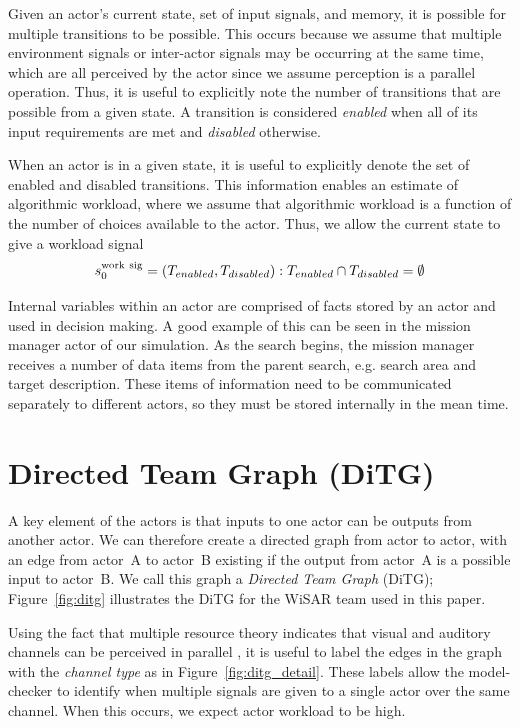 Given an actor's current state, set of input signals, and memory, it is possible for multiple transitions to be possible.  This occurs because we assume that multiple environment signals or inter-actor signals may be occurring at the same time, which are all perceived by the actor since we assume perception is a parallel operation.  Thus, it is useful to explicitly note the number of transitions that are possible from a given state.   A transition is considered {\em enabled} when all of its input
requirements are met and {\em disabled} otherwise. 

When an actor is in a given state, it is useful to explicitly denote the set of enabled and disabled transitions.  This information enables an estimate of algorithmic workload, where we assume that algorithmic workload is a function of the number of choices available to the actor.  Thus, we allow the current state to give a workload signal
\begin{equation}
	s_0^{\rm work\  sig} = (T_{enabled}, T_{disabled}) : T_{enabled} \cap T_{disabled} = \emptyset
 \label{eq:state}
\end{equation}

Internal variables within an actor are comprised of facts stored by an actor and used in decision making.
A good example of this can be seen in the mission manager actor of our simulation. As the search begins, the mission manager receives a number of data items from the parent search, e.g. search area and target description. These items of information need to be communicated separately to different actors, so they must be stored internally in the mean time. 

\section{Directed Team Graph (DiTG)}

A key element of the actors is that inputs to one actor can be outputs from another actor.  We can therefore create a directed graph from actor to actor, with an edge from actor~A to actor~B existing if the output from actor~A is a possible input to actor~B.  We call this graph a {\em Directed Team Graph} (DiTG); Figure~\ref{fig:ditg} illustrates the DiTG for the WiSAR team used in this paper.   

Using the fact that multiple resource theory indicates that visual and auditory channels can be perceived in parallel \cite{wickens2002multiple}, it is useful to label the edges in the graph with the {\em channel type} as in Figure~\ref{fig:ditg_detail}.  These labels allow the model-checker to identify when multiple signals are given to a single actor over the same channel.  When this occurs, we expect actor workload to be high.

